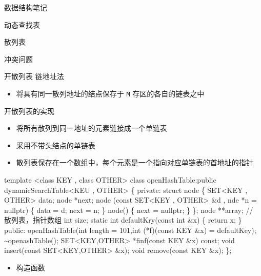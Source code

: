 \documentclass[
  ignorenonframetext,
]{beamer}
\newenvironment{Shaded}{}{}
\newcommand{\NormalTok}[1]{#1}
\providecommand{\tightlist}{%
  \setlength{\itemsep}{0pt}\setlength{\parskip}{0pt}}
\begin{document}
\begin{frame}[fragile]{数据结构笔记}
\begin{block}{动态查找表}
\begin{block}{散列表}
\begin{block}{冲突问题}
\begin{block}{开散列表}
\protect{}\label{ux5f00ux6563ux5217ux8868}
链地址法

\begin{itemize}
\tightlist
\item
  将具有同一散列地址的结点保存于 \texttt{M} 存区的各自的链表之中
\end{itemize}

\begin{block}{开散列表的实现}
\protect{}\label{ux5f00ux6563ux5217ux8868ux7684ux5b9eux73b0}
\begin{itemize}
\tightlist
\item
  将所有散列到同一地址的元素链接成一个单链表
\item
  采用不带头结点的单链表
\item
  散列表保存在一个数组中，每个元素是一个指向对应单链表的首地址的指针
\end{itemize}

\begin{Shaded}
\begin{Highlighting}[]
\NormalTok{template \textless{}class KEY , class OTHER\textgreater{}}
\NormalTok{class openHashTable:public dynamicSearchTable\textless{}KEU , OTHER\textgreater{}}
\NormalTok{\{}
\NormalTok{  private:}
\NormalTok{    struct node}
\NormalTok{    \{}
\NormalTok{      SET\textless{}KEY , OTHER\textgreater{} data;}
\NormalTok{      node *next;}
\NormalTok{      node (const SET\textless{}KEY , OTHER\textgreater{} \&d , nde *n = nullptr)}
\NormalTok{      \{}
\NormalTok{        data = d;}
\NormalTok{        next = n;}
\NormalTok{      \}}
\NormalTok{      node()}
\NormalTok{      \{}
\NormalTok{        next = nullptr;}
\NormalTok{      \}}
\NormalTok{    \};}
\NormalTok{    node **array; // 散列表，指针数组}
\NormalTok{     int size;}
\NormalTok{     static int defaultKry(const int \&x)}
\NormalTok{     \{}
\NormalTok{        return x;}
\NormalTok{     \}}
\NormalTok{  public:}
\NormalTok{    openHashTable(int length = 101,int (*f)(const KEY \&x) = defaultKey);}
\NormalTok{    \textasciitilde{}openashTable();}
\NormalTok{    SET\textless{}KEY,OTHER\textgreater{} *finf(const KEY \&x) const;}
\NormalTok{    void insert(const SET\textless{}KEY,OTHER\textgreater{} \&x);}
\NormalTok{    void remove(const KEY \&x);}
\NormalTok{\};}
\end{Highlighting}
\end{Shaded}

\begin{itemize}
\tightlist
\item
  构造函数
\end{itemize}


\end{block}
\end{block}
\end{block}
\end{block}
\end{block}
\end{frame}
\end{document}
